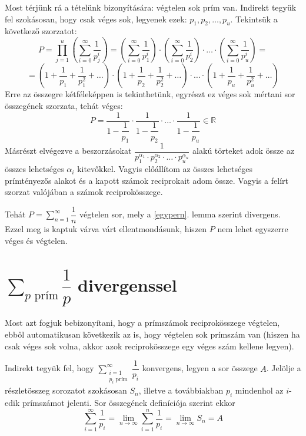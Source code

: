 \documentclass[12pt]{book}
\theoremstyle{plain} %
\theoremstyle{definition} %
\theoremstyle{remark}
\numberwithin{equation}{section}  %
\def\R{\mathbb{R}}
\begin{document}
	Most térjünk rá a tételünk bizonyítására: végtelen sok prím van. Indirekt tegyük fel szokásosan, hogy csak véges sok, legyenek ezek: $p_1, p_2, \ldots, p_u$. Tekintsük a következő szorzatot:
	\[ P = \prod\limits_{j=1}^{u} \left(\sum\limits_{i=0}^{\infty} \dfrac{1}{p_j^i} \right) = \left(\sum\limits_{i=0}^{\infty} \dfrac{1}{p_1^i}\right)\cdot \left(\sum\limits_{i=0}^{\infty} \dfrac{1}{p_2^i}\right)\cdot \ldots \cdot \left(\sum\limits_{i=0}^{\infty} \dfrac{1}{p_u^i} \right) = 
	 \]
	\[ = \left( 1 + \dfrac{1}{p_1} + \dfrac{1}{p_1^2} + \ldots \right) \cdot \left( 1 + \dfrac{1}{p_2} + \dfrac{1}{p_2^2} + \ldots \right) \cdot \ldots \cdot \left( 1 + \dfrac{1}{p_u} + \dfrac{1}{p_u^2} + \ldots \right)\]
	Erre az összegre kétféleképpen is tekinthetünk, egyrészt ez véges sok mértani sor összegének szorzata, tehát véges:
	\[ P = \dfrac{1}{1-\dfrac{1}{p_1}} \cdot \dfrac{1}{1-\dfrac{1}{p_2}} \cdot \ldots \cdot \dfrac{1}{1-\dfrac{1}{p_u}} \in \R  \]
	Másrészt elvégezve a beszorzásokat $\dfrac{1}{p_1^{\alpha_1}\cdot p_2^{\alpha_2}\cdot \ldots \cdot p_u^{\alpha_u}}$ alakú törteket adok össze az összes lehetséges $\alpha_i$ kitevőkkel. Vagyis előállítom az összes lehetséges prímtényezős alakot és a kapott számok reciprokait adom össze. Vagyis a felírt szorzat valójában a számok reciprokösszege.
	
	Tehát $P=\sum\limits_{n = 1}^{\infty} \dfrac{1}{n}$ végtelen sor, mely a \ref{egypern}. lemma szerint divergens. Ezzel meg is kaptuk várva várt ellentmondásunk, hiszen $P$ nem lehet egyszerre véges és végtelen.
	
	\section{$\displaystyle \sum_{p\text{ prím}} \dfrac{1}{p}$ divergenssel}
	
	Most azt fogjuk bebizonyítani, hogy a prímszámok reciprokösszege végtelen, ebből automatikusan következik az is, hogy végtelen sok prímszám van (hiszen ha csak véges sok volna, akkor azok reciprokösszege egy véges szám kellene legyen).
	
	Indirekt tegyük fel, hogy $\displaystyle \sum_{\substack{i=1 \\  p_i\text{ prím}}}^{\infty} \dfrac{1}{p_i}$ konvergens, legyen a sor összege $A$. Jelölje a részletösszeg sorozatot szokásosan $S_n$, illetve a továbbiakban $p_i$ mindenhol az $i$-edik prímszámot jelenti. Sor összegének definíciója szerint ekkor
	\[ \sum_{i=1}^{\infty} \dfrac{1}{p_i} = \lim\limits_{n\to \infty} \sum_{i=1}^{n} \dfrac{1}{p_i} = \lim\limits_{n\to \infty} S_n = A \]
	
\end{document}
